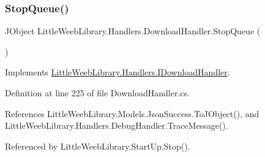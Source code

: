 \mbox{\label{class_little_weeb_library_1_1_handlers_1_1_download_handler_a8fd807f023ed25e031844da3927e1a23}} 
\subsubsection{\texorpdfstring{Stop\+Queue()}{StopQueue()}}
{\footnotesize\ttfamily J\+Object Little\+Weeb\+Library.\+Handlers.\+Download\+Handler.\+Stop\+Queue (\begin{DoxyParamCaption}{ }\end{DoxyParamCaption})}



Implements \mbox{\hyperlink{interface_little_weeb_library_1_1_handlers_1_1_i_download_handler_a7cc8a36cbac3bcfb4e9761fae2c5ac53}{Little\+Weeb\+Library.\+Handlers.\+I\+Download\+Handler}}.



Definition at line 225 of file Download\+Handler.\+cs.



References Little\+Weeb\+Library.\+Models.\+Json\+Success.\+To\+J\+Object(), and Little\+Weeb\+Library.\+Handlers.\+Debug\+Handler.\+Trace\+Message().



Referenced by Little\+Weeb\+Library.\+Start\+Up.\+Stop().


